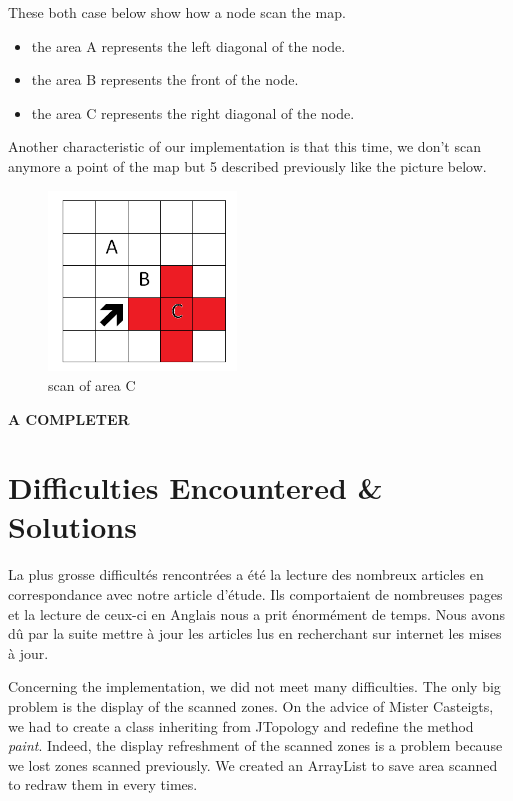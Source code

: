These both case below show how a node scan the map.

\begin{itemize}
\item the area A represents the left diagonal of the node.
\item the area B represents the front of the node.
\item the area C represents the right diagonal of the node.
\end{itemize}

Another characteristic of our implementation is that this time, we don't scan anymore a point of the map but 5 described previously  like the picture below.

\begin{figure}[!h]
\center
\includegraphics[width=5cm]{../images/grille_case_2_scan.png}
\caption{scan of area C}
\end{figure}

\textbf{A COMPLETER}

\section{Difficulties Encountered \& Solutions}

La plus grosse difficultés rencontrées a été la lecture des nombreux articles en correspondance avec notre article d'étude. Ils comportaient de nombreuses pages et la lecture de ceux-ci en Anglais nous a prit énormément de temps. Nous avons dû par la suite mettre à jour les articles lus en recherchant sur internet les mises à jour.

Concerning the implementation, we did not meet many difficulties. The only big problem is the display of the scanned zones. On the advice of Mister Casteigts, we had to create a class inheriting from JTopology and redefine the method \textit{paint}. Indeed, the display refreshment of the scanned zones is a problem because we lost zones scanned previously. We created an ArrayList to save area scanned to redraw them in every times.